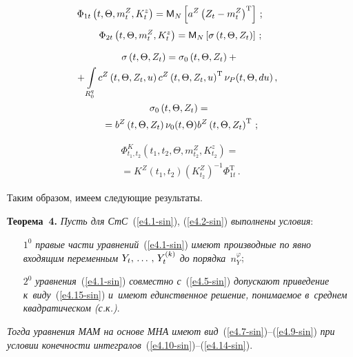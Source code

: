 \begin{multicols}{2}
\begin{enumerate}[(1)]
    \noindent
        \begin{equation}
\hspace*{-8mm}\Phi_{1t} \left(t,\Theta,m_t^Z, K_t^z\right)=
   \mm_N \lk a^Z \left(Z_t - m_t^Z\right)^{\mathrm{T}}\rk\,;\label{e4.12-sin}
   \end{equation}
   \begin{equation}
   \Phi_{2t} \left(t,\Theta,m_t^Z, K_t^z\right)=
   {\sf M}_N \left[ \sigma\left(t,\Theta,Z_t\right)\right]\,;\label{e4.13-sin}
\end{equation}
   
           \vspace*{-12pt}
        
        \noindent
   \begin{multline}
\sigma\left(t,\Theta,Z_t\right)= 
      \sigma_0\left(t,\Theta,Z_t\right) +{}\\
  \hspace*{-8pt}{}+\int\limits_{R_0^q}  
     c^Z\left(t,\Theta,Z_t,u\right) c^Z \left(t,\Theta,Z_t,u\right)^{\mathrm{T}} 
     \nu_P (t,\Theta,du)\,,\\
\sigma_0\left(t,\Theta,Z_t\right) ={}\\
{}=  b^Z \left(t,\Theta,Z_t\right) 
    \nu_0 (t,\Theta) b^Z\left(t,\Theta,Z_t\right)^{\mathrm{T}}\,;\label{e4.14-sin}
        \end{multline}
        
        \vspace*{-12pt}
        
        \noindent
        \begin{multline}
\Phi^K_{t_1,t_2} \left(t_1, t_2,\Theta,m_{t_2}^Z, K_{t_2}^z\right)={}\\
{}=
    K^Z \left(t_1, t_2\right) \left(K_{t_2}^Z\right)^{-1}\! \Phi_{1t}^{\mathrm{T}}\,.
    \label{e4.15-sin}
\end{multline}
    \end{enumerate}

Таким образом, имеем следующие результаты.

\smallskip

\noindent
\textbf{Теорема~4.} 
\textit{Пусть для СтС}~(\ref{e4.1-sin}), (\ref{e4.2-sin}) \textit{выполнены условия}:
\begin{itemize}
\item[$1^0$] \textit{правые части уравнений}~(\ref{e4.1-sin}) 
\textit{имеют производные по явно входящим переменным $Y_t,\,\ldots\,,\, Y_t^{(k)}$ до 
порядка}~$n_Y^\varphi$;

\item[$2^0$] \textit{уравнения}~(\ref{e4.1-sin}) \textit{совместно с}~(\ref{e4.5-sin}) 
\textit{допускают приведение к~виду}~(\ref{e4.15-sin}) 
\textit{и~имеют единственное решение, понимаемое в~среднем квадратическом (с.к.)}.
\end{itemize}
\textit{Тогда уравнения МАМ на основе МНА имеют вид}~(\ref{e4.7-sin})--(\ref{e4.9-sin}) 
\textit{при условии конечности интегралов}~(\ref{e4.10-sin})--(\ref{e4.14-sin}).



\end{multicols}

